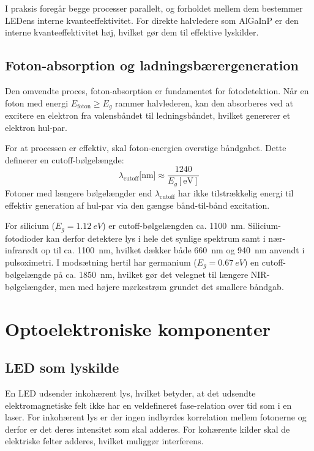 I praksis foregår begge processer parallelt, og forholdet mellem dem bestemmer LEDens interne kvanteeffektivitet. For direkte halvledere som AlGaInP er den interne kvanteeffektivitet høj, hvilket gør dem til effektive lyskilder.

\subsection{Foton-absorption og ladningsbærergeneration}

Den omvendte proces, foton-absorption er fundamentet for fotodetektion. Når en foton med energi $E_{\text{foton}} \geq E_g$ rammer halvlederen, kan den absorberes ved at excitere en elektron fra valensbåndet til ledningsbåndet, hvilket genererer et elektron hul-par.

For at processen er effektiv, skal foton-energien overstige båndgabet. Dette definerer en cutoff-bølgelængde:
\begin{equation}
    \lambda_{\text{cutoff}}\text{[nm]} \approx \frac{1240}{E_g [\text{eV}]}
\end{equation}
Fotoner med længere bølgelængder end $\lambda_{\text{cutoff}}$ har ikke tilstrækkelig energi til effektiv generation af hul-par via den gængse bånd-til-bånd excitation.

For silicium ($E_g = \SI{1.12}{eV}$) er cutoff-bølgelængden ca. \SI{1100}{nm}. Silicium-fotodioder kan derfor detektere lys i hele det synlige spektrum samt i nær-infrarødt op til ca. \SI{1100}{nm}, hvilket dækker både \SI{660}{nm} og \SI{940}{nm} anvendt i pulsoximetri. I modsætning hertil har germanium ($E_g = \SI{0.67}{eV}$) en cutoff-bølgelængde på ca. \SI{1850}{nm}, hvilket gør det velegnet til længere NIR-bølgelængder, men med højere mørkestrøm grundet det smallere båndgab.

\section{Optoelektroniske komponenter}
\label{sec:optoelektroniske_komponenter}
    \subsection{LED som lyskilde}   

En LED udsender inkohærent lys, hvilket betyder, at det udsendte elektromagnetiske felt ikke har en veldefineret fase-relation over tid som i en laser. For inkohærent lys er der ingen indbyrdes korrelation mellem fotonerne og derfor er det deres intensitet som skal adderes. For kohærente kilder skal de elektriske felter adderes, hvilket muliggør interferens.

